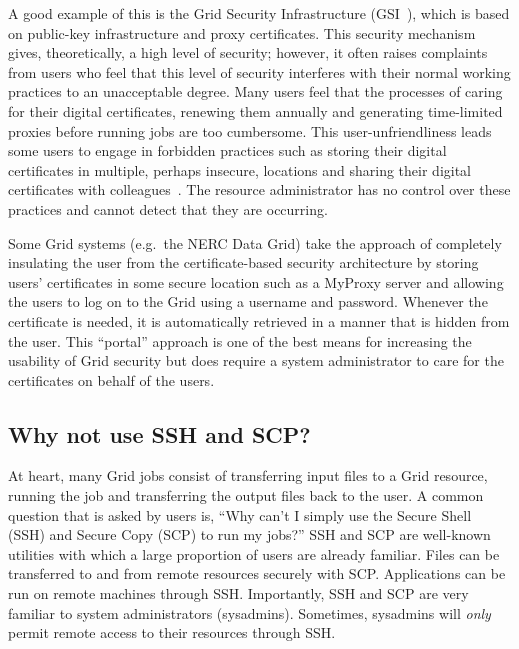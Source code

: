 \documentclass[a4paper]{article}
\begin{document}
\begin{multicols}{2}
A good example of this is the Grid Security Infrastructure (GSI~\cite{gsi}), which is based on public-key infrastructure and proxy certificates.  This security mechanism gives, theoretically, a high level of security; however, it often raises complaints from users who feel that this level of security interferes with their normal working practices to an unacceptable degree.  Many users feel that the processes of caring for their digital certificates, renewing them annually and generating time-limited proxies before running jobs are too cumbersome.  This user-unfriendliness leads some users to engage in forbidden practices such as storing their digital certificates in multiple, perhaps insecure, locations and sharing their digital certificates with colleagues~\cite{beckles:2005}.  The resource administrator has no control over these practices and cannot detect that they are occurring.

Some Grid systems (e.g.\ the NERC Data Grid) take the approach of completely insulating the user from the certificate-based security architecture by storing users' certificates in some secure location such as a MyProxy server and allowing the users to log on to the Grid using a username and password.  Whenever the certificate is needed, it is automatically retrieved in a manner that is hidden from the user.  This ``portal'' approach is one of the best means for increasing the usability of Grid security but does require a system administrator to care for the certificates on behalf of the users.

\subsection{Why not use SSH and SCP?}
At heart, many Grid jobs consist of transferring input files to a Grid resource, running the job and transferring the output files back to the user.  A common question that is asked by users is, ``Why can't I simply use the Secure Shell (SSH) and Secure Copy (SCP) to run my jobs?''  SSH and SCP are 
well-known utilities with which a large proportion of users are already familiar.  Files can be transferred to and from remote resources securely with SCP.  Applications can be run on remote machines through SSH.  Importantly, SSH and SCP are very familiar to system administrators (sysadmins).  Sometimes, sysadmins will {\em only\/} permit remote access to their resources through SSH.


\end{multicols}
\end{document}
